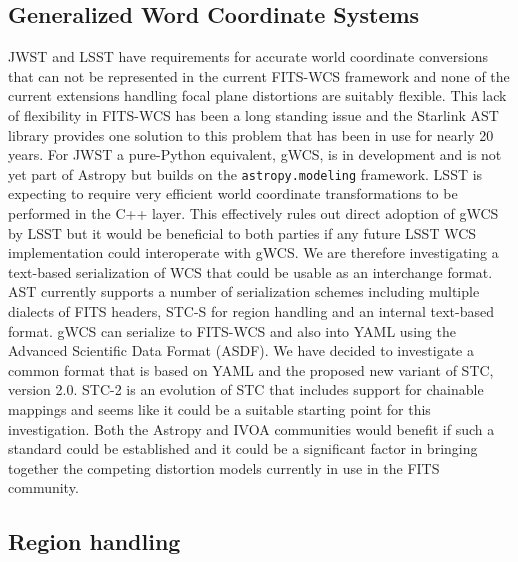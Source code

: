 \documentclass[]{spie}  %
\begin{document}
\subsection{Generalized Word Coordinate Systems}

JWST and LSST have requirements for accurate world coordinate conversions that can not be represented in the current FITS-WCS framework\cite{2013ASPC..475...49H,2002A&A...395.1077C} and none of the current extensions handling focal plane distortions are suitably flexible\cite{2012SPIE.8451E..1MS,2012tpv}.
This lack of flexibility in FITS-WCS has been a long standing issue and the Starlink AST library\cite{Berry201633} provides one solution to this problem that has been in use for nearly 20 years.
For JWST a pure-Python equivalent, gWCS, is in development\cite{2016_P028_adassxxv} and is not yet part of Astropy but builds on the \texttt{astropy.modeling} framework.
LSST is expecting to require very efficient world coordinate transformations to be performed in the C++ layer.
This effectively rules out direct adoption of gWCS by LSST but it would be beneficial to both parties if any future LSST WCS implementation could interoperate with gWCS.
We are therefore investigating a text-based serialization of WCS that could be usable as an interchange format.
AST currently supports a number of serialization schemes including multiple dialects of FITS headers, STC-S\cite{2007ivoa.spec.1030R} for region handling\cite{2010ASPC..434..213B} and an internal text-based format.
gWCS can serialize to FITS-WCS and also into YAML using the Advanced Scientific Data Format (ASDF)\cite{2015A&C....12..240G}.
We have decided to investigate a common format that is based on YAML and the proposed new variant of STC, version 2.0.
STC-2\cite{2015ivoaSTC2} is an evolution of STC that includes support for chainable mappings and seems like it could be a suitable starting point for this investigation.
Both the Astropy and IVOA communities would benefit if such a standard could be established and it could be a significant factor in bringing together the competing distortion models currently in use in the FITS community.

\subsection{Region handling}
\end{document}
